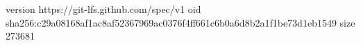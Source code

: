 version https://git-lfs.github.com/spec/v1
oid sha256:c29a08168af1ac8af52367969ac0376f4ff661c6b0a6d8b2a1f1be73d1eb1549
size 273681
